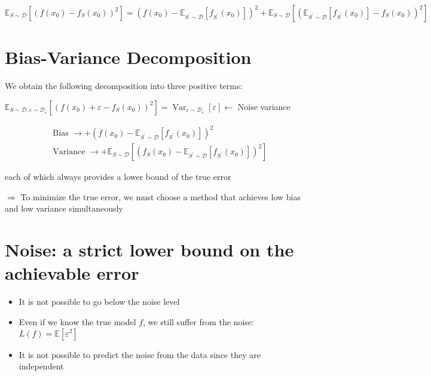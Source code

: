 $$
\mathbb{E}_{S \sim \mathscr{D}}\left[\left(f\left(x_{0}\right)-f_{S}\left(x_{0}\right)\right)^{2}\right]=\left(f\left(x_{0}\right)-\mathbb{E}_{S^{\prime} \sim \mathscr{D}}\left[f_{S^{\prime}}\left(x_{0}\right)\right]\right)^{2}+\mathbb{E}_{S \sim \mathscr{D}}\left[\left(\mathbb{E}_{S^{\prime} \sim \mathscr{D}}\left[f_{S^{\prime}}\left(x_{0}\right)\right]-f_{S}\left(x_{0}\right)\right)^{2}\right]
$$

\section*{Bias-Variance Decomposition}
We obtain the following decomposition into three positive terms:

$\mathbb{E}_{S \sim \mathscr{D}, \varepsilon \sim \mathscr{D}_{\varepsilon}}\left[\left(f\left(x_{0}\right)+\varepsilon-f_{S}\left(x_{0}\right)\right)^{2}\right]=\operatorname{Var}_{\varepsilon \sim \mathscr{D}_{\varepsilon}}[\varepsilon] \longleftarrow$ Noise variance

$$
\begin{aligned}
& \text { Bias } \longrightarrow+\left(f\left(x_{0}\right)-\mathbb{E}_{S^{\prime} \sim \mathscr{D}}\left[f_{S^{\prime}}\left(x_{0}\right)\right]\right)^{2} \\
& \text { Variance } \longrightarrow+\mathbb{E}_{S \sim \mathscr{D}}\left[\left(f_{S}\left(x_{0}\right)-\mathbb{E}_{S^{\prime} \sim \mathscr{D}}\left[f_{S^{\prime}}\left(x_{0}\right)\right]\right)^{2}\right]
\end{aligned}
$$

each of which always provides a lower bound of the true error

$\Rightarrow$ To minimize the true error, we must choose a method that achieves low bias and low variance simultaneously

\section*{Noise: a strict lower bound on the achievable error}

\begin{itemize}
  \item It is not possible to go below the noise level

  \item Even if we know the true model $f$, we still suffer from the noise: $L(f)=\mathbb{E}\left[\varepsilon^{2}\right]$

  \item It is not possible to predict the noise from the data since they are independent

\end{itemize}

